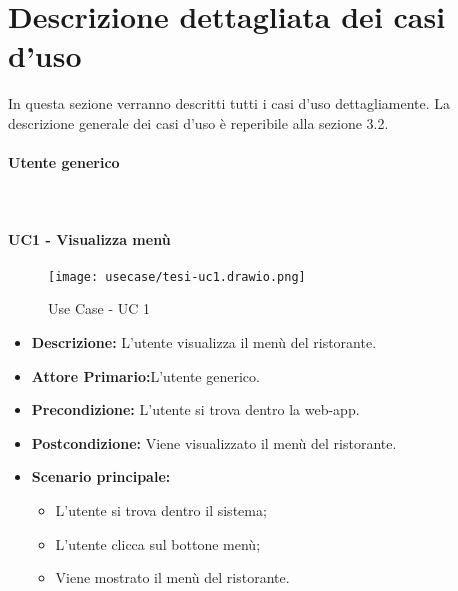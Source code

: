 
\chapter{Descrizione dettagliata dei casi d'uso}
\label{cap:appendice a}
In questa sezione verranno descritti tutti i casi d'uso dettagliamente.
La descrizione generale dei casi d'uso è reperibile alla sezione 3.2.\\

\subsubsection{Utente generico}\\
\subsubsection{UC1 - Visualizza menù}
\begin{figure}[H]
    \centering
    \texttt{[image: usecase/tesi-uc1.drawio.png]}
    \caption{Use Case - UC 1}
\end{figure}
\begin{itemize}
    \item \textbf{Descrizione:} L'utente visualizza il menù del ristorante.
    \item \textbf{Attore Primario:}L'utente generico.
    \item \textbf{Precondizione:} L'utente si trova dentro la web-app.
    \item \textbf{Postcondizione:} Viene visualizzato il menù del ristorante.
    \item \textbf{Scenario principale:}
    \begin{itemize}
        \item L'utente si trova dentro il sistema;
        \item L'utente clicca sul bottone menù;
        \item Viene mostrato il menù del ristorante.
    \end{itemize}
\end{itemize}
